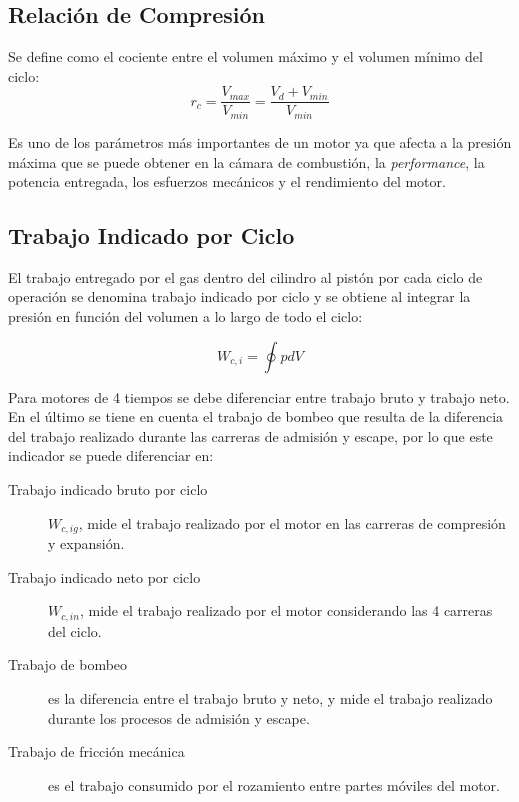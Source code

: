 
\subsection{Relación de Compresión}

Se define como el cociente entre el volumen máximo y el volumen mínimo del ciclo:
%
\begin{equation}\label{eq:rel_comp}
  r_c = \frac{V_{max}}{V_{min}} = \frac{V_d+V_{min}}{V_{min}}
\end{equation}

%
Es uno de los parámetros más importantes de un motor ya que afecta a la presión
máxima que se puede obtener en la cámara de combustión, la \emph{performance},
la potencia entregada, los esfuerzos mecánicos y el rendimiento del motor.


\subsection{Trabajo Indicado por Ciclo}
%
El trabajo entregado por el gas dentro del cilindro al pistón por cada ciclo de
operación se denomina trabajo indicado por ciclo y se obtiene al integrar la
presión en función del volumen a lo largo de todo el ciclo:

\begin{equation}\label{eq:w_indicado}
  W_{c,i} = \oint p dV
\end{equation}

Para motores de 4 tiempos se debe diferenciar entre trabajo bruto y trabajo neto.
%
En el último se tiene en cuenta el trabajo de bombeo que resulta de la
diferencia del trabajo realizado durante las carreras de admisión y escape, por
lo que este indicador se puede diferenciar en:
%
\begin{description}
  \item [Trabajo indicado bruto por ciclo] $W_{c,ig}$, mide el trabajo realizado
por el motor en las carreras de compresión y expansión.
  \item [Trabajo indicado neto por ciclo] $W_{c,in}$, mide el trabajo realizado
por el motor considerando las 4 carreras del ciclo.
  \item [Trabajo de bombeo] es la diferencia entre el trabajo bruto y neto, y
mide el trabajo realizado durante los procesos de admisión y escape.
  \item [Trabajo de fricción mecánica] es el trabajo consumido por el rozamiento
entre partes móviles del motor.
\end{description}

